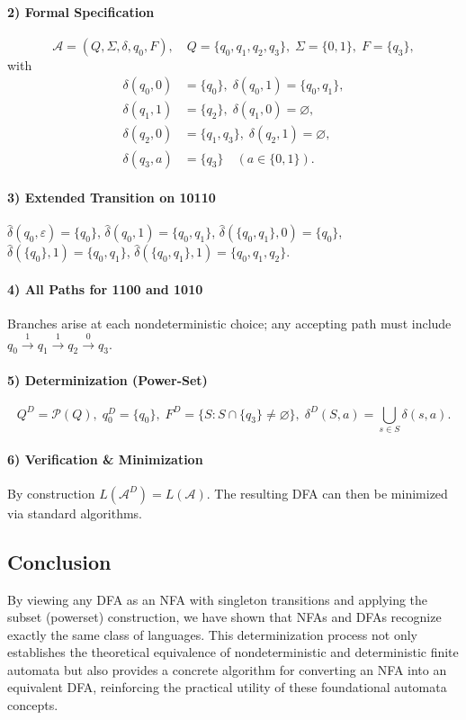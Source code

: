 \documentclass{article}
\theoremstyle{theorem}
\theoremstyle{definition}
\theoremstyle{remark}
\begin{document}
\paragraph{2) Formal Specification}  
\[
\mathcal{A} = (Q,\Sigma,\delta,q_0,F),
\quad
Q=\{q_0,q_1,q_2,q_3\},\;\Sigma=\{0,1\},\;F=\{q_3\},
\]
with
\[
\begin{aligned}
\delta(q_0,0)&=\{q_0\},\;\delta(q_0,1)=\{q_0,q_1\},\\
\delta(q_1,1)&=\{q_2\},\;\delta(q_1,0)=\varnothing,\\
\delta(q_2,0)&=\{q_1,q_3\},\;\delta(q_2,1)=\varnothing,\\
\delta(q_3,a)&=\{q_3\}\quad(a\in\{0,1\}).
\end{aligned}
\]

\paragraph{3) Extended Transition on 10110}  
\(\hat{\delta}(q_0,\varepsilon)=\{q_0\}\),  
\(\hat{\delta}(q_0,1)=\{q_0,q_1\}\),  
\(\hat{\delta}(\{q_0,q_1\},0)=\{q_0\}\),  
\(\hat{\delta}(\{q_0\},1)=\{q_0,q_1\}\),  
\(\hat{\delta}(\{q_0,q_1\},1)=\{q_0,q_1,q_2\}\).

\paragraph{4) All Paths for 1100 and 1010}  
Branches arise at each nondeterministic choice; any accepting path must include  
\(q_0\xrightarrow{1}q_1\xrightarrow{1}q_2\xrightarrow{0}q_3\).

\paragraph{5) Determinization (Power-Set)}  
\[
Q^D=\mathcal{P}(Q),\;
q_0^D=\{q_0\},\;
F^D=\{S:S\cap\{q_3\}\neq\varnothing\},\;
\delta^D(S,a)=\bigcup_{s\in S}\delta(s,a).
\]

\paragraph{6) Verification \& Minimization}  
By construction \(L(\mathcal{A}^D)=L(\mathcal{A})\). The resulting DFA can then be minimized via standard algorithms.

\subsection{Conclusion}
By viewing any DFA as an NFA with singleton transitions and applying the subset (powerset) construction, we have shown that NFAs and DFAs recognize exactly the same class of languages.  This determinization process not only establishes the theoretical equivalence of nondeterministic and deterministic finite automata but also provides a concrete algorithm for converting an NFA into an equivalent DFA, reinforcing the practical utility of these foundational automata concepts.
\end{document}
